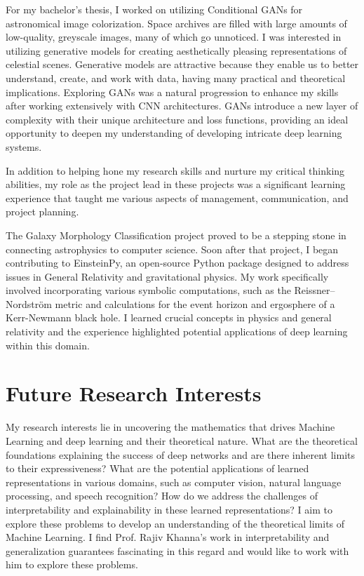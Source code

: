 \documentclass{article}
\begin{document}
For my bachelor's thesis, I worked on utilizing Conditional GANs for
astronomical image colorization. Space archives are filled with large amounts of
low-quality, greyscale images, many of which go unnoticed. I was interested in
utilizing generative models for creating aesthetically pleasing representations
of celestial scenes. Generative models are attractive because they enable us to
better understand, create, and work with data, having many practical and
theoretical implications. Exploring GANs was a natural progression to enhance my
skills after working extensively with CNN architectures. GANs introduce a new
layer of complexity with their unique architecture and loss functions, providing
an ideal opportunity to deepen my understanding of developing intricate deep
learning systems. \citep{kalvankar2022astronomical}

In addition to helping hone my research skills and nurture my critical thinking
abilities, my role as the project lead in these projects was a significant
learning experience that taught me various aspects of management, communication,
and project planning.

The Galaxy Morphology Classification project proved to be a stepping stone in
connecting astrophysics to computer science. Soon after that project, I began
contributing to EinsteinPy, an open-source Python package designed to address
issues in General Relativity and gravitational physics. My work specifically
involved incorporating various symbolic computations, such as the
Reissner–Nordström metric and calculations for the event horizon and ergosphere
of a Kerr-Newmann black hole. I learned crucial concepts in physics and general
relativity and the experience highlighted potential applications of deep
learning within this domain. \citep{bapat2020einsteinpy}

\section*{Future Research Interests}

\hspace*{0.25in}My research interests lie in uncovering the mathematics that drives Machine
Learning and deep learning and their theoretical nature. What are the
theoretical foundations explaining the success of deep networks and are there
inherent limits to their expressiveness? What are the potential applications of
learned representations in various domains, such as computer vision, natural
language processing, and speech recognition? How do we address the challenges of
interpretability and explainability in these learned representations? I aim to
explore these problems to develop an understanding of the theoretical limits of
Machine Learning. I find Prof. Rajiv Khanna's work in interpretability and
generalization guarantees fascinating in this regard and would like to work with
him to explore these problems.
\end{document}
